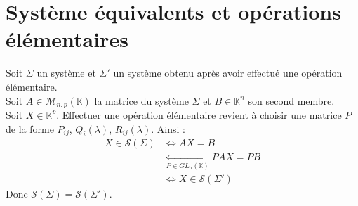\documentclass[../main.tex]{subfiles}
\begin{document}
\setcounter{section}{73}
\section{Système équivalents et opérations élémentaires}
Soit $\Sigma$ un système et $\Sigma'$ un système obtenu après avoir effectué une opération élémentaire. \\
Soit $A \in \mathcal{M}_{n,p}(\mathbb{K})$ la matrice du système $\Sigma$ et $B \in \mathbb{K}^n$ son second membre. \\
Soit $X \in \mathbb{K}^p$. 
Effectuer une opération élémentaire revient à choisir une matrice $P$ de la forme $P_{ij}$, $Q_i(\lambda)$, $R_{ij}(\lambda)$. 
Ainsi : 
\begin{align*}
    X \in \mathcal{S}(\Sigma) &\Leftrightarrow AX = B \\
    &\underset{P \in GL_n(\mathbb{K})}{\Leftrightarrow} PAX = PB \\
    &\Leftrightarrow X \in \mathcal{S}(\Sigma')
\end{align*}
Donc $\boxed{\mathcal{S}(\Sigma) = \mathcal{S}(\Sigma')}$. 
\end{document}
